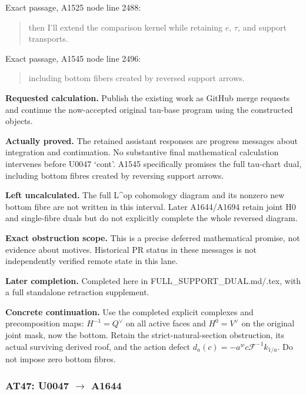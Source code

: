 Exact passage, A1525 node
\protect{} line 2488:

\begin{quote}
then I'll extend the comparison kernel while retaining \(e\), \(\tau\),
and support transports.
\end{quote}

Exact passage, A1545 node
\protect{} line 2496:

\begin{quote}
including bottom fibers created by reversed support arrows.
\end{quote}

\textbf{Requested calculation.} Publish the existing work as GitHub
merge requests and continue the now-accepted original tau-base program
using the constructed objects.

\textbf{Actually proved.} The retained assistant responses are progress
messages about integration and continuation. No substantive final
mathematical calculation intervenes before U0047 `cont'. A1545
specifically promises the full tau-chart dual, including bottom fibres
created by reversing support arrows.

\textbf{Left uncalculated.} The full L\^{}op cohomology diagram and its
nonzero new bottom fibre are not written in this interval. Later
A1644/A1694 retain joint H0 and single-fibre duals but do not explicitly
complete the whole reversed diagram.

\textbf{Exact obstruction scope.} This is a precise deferred
mathematical promise, not evidence about motives. Historical PR status
in these messages is not independently verified remote state in this
lane.

\textbf{Later completion.} Completed here in
FULL\_SUPPORT\_DUAL.md/.tex, with a full standalone retraction
supplement.

\textbf{Concrete continuation.} Use the completed explicit complexes and
precomposition maps: \(H^{-1}=Q^\vee\) on all active faces and
\(H^0=V^\vee\) on the original joint mask, now the bottom. Retain the
strict-natural-section obstruction, its actual surviving derived roof,
and the action defect \(d_a(c)=-a^w c\mathcal F^{-1}k_{1/a}\). Do not
impose zero bottom fibres.

\subsubsection{\texorpdfstring{AT47: U0047
\allowbreak{}\ensuremath{→}\allowbreak{}
A1644}{AT47: U0047  A1644}}\label{at47-u0047-a1644}

